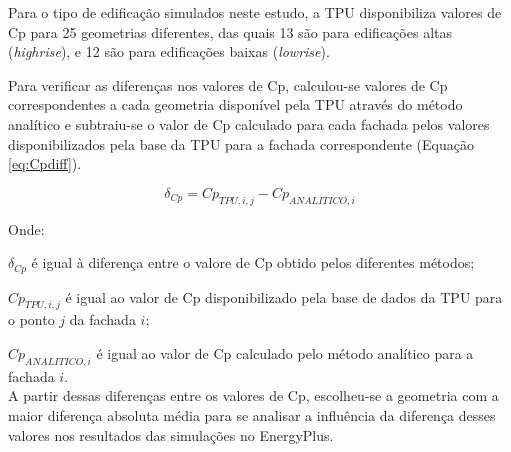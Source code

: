 \documentclass[brazil,hardcopy,openany,a5paper]{ufscthesis}
\begin{document}
		Para o tipo de edificação simulados neste estudo, a TPU disponibiliza valores de Cp para 25 geometrias diferentes, das quais 13 são para edificações altas (\textit{highrise}), e 12 são para edificações baixas (\textit{lowrise}).
%		
		
		Para verificar as diferenças nos valores de Cp, calculou-se valores de Cp correspondentes a cada geometria disponível pela TPU através do método analítico e subtraiu-se o valor de Cp calculado para cada fachada pelos valores disponibilizados pela base da TPU para a fachada correspondente (Equação \ref{eq:Cpdiff}).
		
		\begin{equation}
		\label{eq:Cpdiff}
		\delta_{Cp} = Cp_{TPU,i,j} - Cp_{ANALITICO, i}
		\end{equation}
		
		Onde:
		
		$\delta_{Cp}$ é igual à diferença entre o valore de Cp obtido pelos diferentes métodos;
		
		$Cp_{TPU,i,j}$ é igual ao valor de Cp disponibilizado pela base de dados da TPU para o ponto $j$ da fachada $i$;
		
		$Cp_{ANALITICO, i}$ é igual ao valor de Cp calculado pelo método analítico para a fachada $i$.
		\\
		
		A partir dessas diferenças entre os valores de Cp, escolheu-se a geometria com a maior diferença absoluta média para se analisar a influência da diferença desses valores nos resultados das simulações no EnergyPlus.
		
\end{document}
